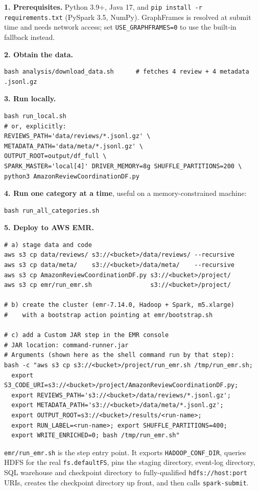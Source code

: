 \documentclass[12pt]{article}
\begin{document}
\textbf{1. Prerequisites.} Python 3.9+, Java 17, and
\texttt{pip install -r requirements.txt} (PySpark 3.5, NumPy). GraphFrames is
resolved at submit time and needs network access; set
\texttt{USE\_GRAPHFRAMES=0} to use the built-in fallback instead.

\textbf{2. Obtain the data.}
\begin{lstlisting}
bash analysis/download_data.sh      # fetches 4 review + 4 metadata .jsonl.gz
\end{lstlisting}

\textbf{3. Run locally.}
\begin{lstlisting}
bash run_local.sh
# or, explicitly:
REVIEWS_PATH='data/reviews/*.jsonl.gz' \
METADATA_PATH='data/meta/*.jsonl.gz' \
OUTPUT_ROOT=output/df_full \
SPARK_MASTER='local[4]' DRIVER_MEMORY=8g SHUFFLE_PARTITIONS=200 \
python3 AmazonReviewCoordinationDF.py
\end{lstlisting}

\textbf{4. Run one category at a time}, useful on a memory-constrained
machine:
\begin{lstlisting}
bash run_all_categories.sh
\end{lstlisting}

\textbf{5. Deploy to AWS EMR.}
\begin{lstlisting}
# a) stage data and code
aws s3 cp data/reviews/ s3://<bucket>/data/reviews/ --recursive
aws s3 cp data/meta/    s3://<bucket>/data/meta/    --recursive
aws s3 cp AmazonReviewCoordinationDF.py s3://<bucket>/project/
aws s3 cp emr/run_emr.sh                s3://<bucket>/project/

# b) create the cluster (emr-7.14.0, Hadoop + Spark, m5.xlarge)
#    with a bootstrap action pointing at emr/bootstrap.sh

# c) add a Custom JAR step in the EMR console
# JAR location: command-runner.jar
# Arguments (shown here as the shell command run by that step):
bash -c "aws s3 cp s3://<bucket>/project/run_emr.sh /tmp/run_emr.sh;
  export S3_CODE_URI=s3://<bucket>/project/AmazonReviewCoordinationDF.py;
  export REVIEWS_PATH='s3://<bucket>/data/reviews/*.jsonl.gz';
  export METADATA_PATH='s3://<bucket>/data/meta/*.jsonl.gz';
  export OUTPUT_ROOT=s3://<bucket>/results/<run-name>;
  export RUN_LABEL=<run-name>; export SHUFFLE_PARTITIONS=400;
  export WRITE_ENRICHED=0; bash /tmp/run_emr.sh"
\end{lstlisting}

\texttt{emr/run\_emr.sh} is the step entry point. It exports
\texttt{HADOOP\_CONF\_DIR}, queries HDFS for the real \texttt{fs.defaultFS},
pins the staging directory, event-log directory, SQL warehouse and checkpoint
directory to fully-qualified \texttt{hdfs://host:port} URIs, creates the
checkpoint directory up front, and then calls \texttt{spark-submit}.
\end{document}
